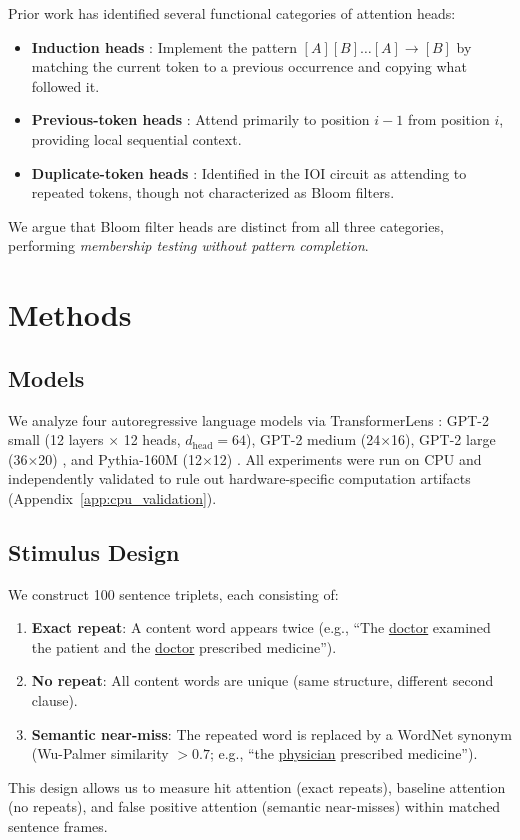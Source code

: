 \documentclass[11pt]{article}
\begin{document}
Prior work has identified several functional categories of attention heads:
\begin{itemize}
    \item \textbf{Induction heads} \citep{olsson2022context}: Implement the pattern $[A][B] \ldots [A] \to [B]$ by matching the current token to a previous occurrence and copying what followed it.
    \item \textbf{Previous-token heads} \citep{elhage2021mathematical}: Attend primarily to position $i-1$ from position $i$, providing local sequential context.
    \item \textbf{Duplicate-token heads} \citep{wang2022interpretability}: Identified in the IOI circuit as attending to repeated tokens, though not characterized as Bloom filters.
\end{itemize}
We argue that Bloom filter heads are distinct from all three categories, performing \emph{membership testing without pattern completion}.

\section{Methods}
\label{sec:methods}

\subsection{Models}

We analyze four autoregressive language models via TransformerLens \citep{nanda2022transformerlens}: GPT-2 small (12 layers $\times$ 12 heads, $d_\text{head} = 64$), GPT-2 medium (24$\times$16), GPT-2 large (36$\times$20) \citep{radford2019language}, and Pythia-160M (12$\times$12) \citep{biderman2023pythia}. All experiments were run on CPU and independently validated to rule out hardware-specific computation artifacts (Appendix~\ref{app:cpu_validation}).

\subsection{Stimulus Design}

We construct 100 sentence triplets, each consisting of:
\begin{enumerate}
    \item \textbf{Exact repeat}: A content word appears twice (e.g., ``The \underline{doctor} examined the patient and the \underline{doctor} prescribed medicine'').
    \item \textbf{No repeat}: All content words are unique (same structure, different second clause).
    \item \textbf{Semantic near-miss}: The repeated word is replaced by a WordNet synonym (Wu-Palmer similarity $> 0.7$; e.g., ``the \underline{physician} prescribed medicine'').
\end{enumerate}
This design allows us to measure hit attention (exact repeats), baseline attention (no repeats), and false positive attention (semantic near-misses) within matched sentence frames.
\end{document}
